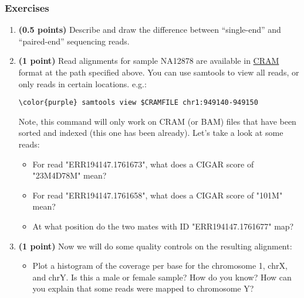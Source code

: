 \documentclass[12pt]{article}
\begin{document}
\subsubsection*{Exercises}
\begin{enumerate}
\item \textbf{(0.5 points)} Describe and draw the difference between ``single-end'' and ``paired-end'' sequencing reads.

\item \textbf{(1 point)} Read alignments for sample NA12878 are available in \href{https://samtools.github.io/hts-specs/CRAMv3.pdf}{CRAM} format at the path specified above. You can use samtools to view all reads, or only reads in certain locations. e.g.:

\begin{Verbatim}[commandchars=\\\{\}]
\color{purple} samtools view $CRAMFILE chr1:949140-949150
\end{Verbatim}

Note, this command will only work on CRAM (or BAM) files that have been sorted and indexed (this one has been already). Let's take a look at some reads:
\begin{itemize}
	\item For read "ERR194147.1761673", what does a CIGAR score of "23M4D78M" mean?
	\item For read "ERR194147.1761658", what does a CIGAR score of "101M" mean?
	\item At what position do the two mates with ID "ERR194147.1761677" map? %
	\end{itemize}



\item \textbf{(1 point)} Now we will do some quality controls on the resulting alignment:
\begin{itemize}
	\item Plot a histogram of the coverage per base for the chromosome 1, chrX, and chrY. Is this a male or female sample? How do you know? How can you explain that some reads were mapped to chromosome Y?


\end{itemize}
\end{enumerate}
\end{document}
